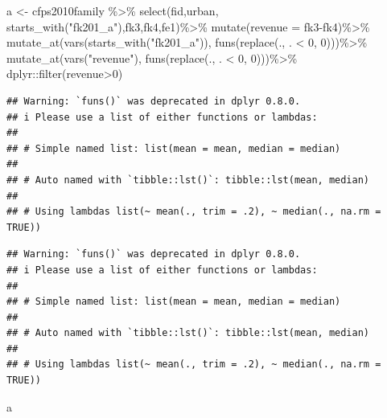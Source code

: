 \documentclass[
  oneside]{book}
\newenvironment{Shaded}{\begin{snugshade}}{\end{snugshade}}
\newcommand{\AttributeTok}[1]{\textcolor[rgb]{0.77,0.63,0.00}{#1}}
\newcommand{\DecValTok}[1]{\textcolor[rgb]{0.00,0.00,0.81}{#1}}
\newcommand{\FunctionTok}[1]{\textcolor[rgb]{0.00,0.00,0.00}{#1}}
\newcommand{\NormalTok}[1]{#1}
\newcommand{\OtherTok}[1]{\textcolor[rgb]{0.56,0.35,0.01}{#1}}
\newcommand{\SpecialCharTok}[1]{\textcolor[rgb]{0.00,0.00,0.00}{#1}}
\newcommand{\StringTok}[1]{\textcolor[rgb]{0.31,0.60,0.02}{#1}}
\begin{document}
\begin{Shaded}
\begin{Highlighting}[]
\NormalTok{a }\OtherTok{\textless{}{-}}\NormalTok{ cfps2010family }\SpecialCharTok{\%\textgreater{}\%}
  \FunctionTok{select}\NormalTok{(fid,urban, }\FunctionTok{starts\_with}\NormalTok{(}\StringTok{"fk201\_a"}\NormalTok{),fk3,fk4,fe1)}\SpecialCharTok{\%\textgreater{}\%}
  \FunctionTok{mutate}\NormalTok{(}\AttributeTok{revenue =}\NormalTok{ fk3}\SpecialCharTok{{-}}\NormalTok{fk4)}\SpecialCharTok{\%\textgreater{}\%}
  \FunctionTok{mutate\_at}\NormalTok{(}\FunctionTok{vars}\NormalTok{(}\FunctionTok{starts\_with}\NormalTok{(}\StringTok{"fk201\_a"}\NormalTok{)), }\FunctionTok{funs}\NormalTok{(}\FunctionTok{replace}\NormalTok{(., . }\SpecialCharTok{\textless{}} \DecValTok{0}\NormalTok{, }\DecValTok{0}\NormalTok{)))}\SpecialCharTok{\%\textgreater{}\%}
  \FunctionTok{mutate\_at}\NormalTok{(}\FunctionTok{vars}\NormalTok{(}\StringTok{"revenue"}\NormalTok{), }\FunctionTok{funs}\NormalTok{(}\FunctionTok{replace}\NormalTok{(., . }\SpecialCharTok{\textless{}} \DecValTok{0}\NormalTok{, }\DecValTok{0}\NormalTok{)))}\SpecialCharTok{\%\textgreater{}\%}
\NormalTok{  dplyr}\SpecialCharTok{::}\FunctionTok{filter}\NormalTok{(revenue}\SpecialCharTok{\textgreater{}}\DecValTok{0}\NormalTok{)}
\end{Highlighting}
\end{Shaded}

\begin{verbatim}
## Warning: `funs()` was deprecated in dplyr 0.8.0.
## i Please use a list of either functions or lambdas:
## 
## # Simple named list: list(mean = mean, median = median)
## 
## # Auto named with `tibble::lst()`: tibble::lst(mean, median)
## 
## # Using lambdas list(~ mean(., trim = .2), ~ median(., na.rm = TRUE))
\end{verbatim}

\begin{verbatim}
## Warning: `funs()` was deprecated in dplyr 0.8.0.
## i Please use a list of either functions or lambdas:
## 
## # Simple named list: list(mean = mean, median = median)
## 
## # Auto named with `tibble::lst()`: tibble::lst(mean, median)
## 
## # Using lambdas list(~ mean(., trim = .2), ~ median(., na.rm = TRUE))
\end{verbatim}

\begin{Shaded}
\begin{Highlighting}[]
\NormalTok{a}
\end{Highlighting}
\end{Shaded}
\end{document}
